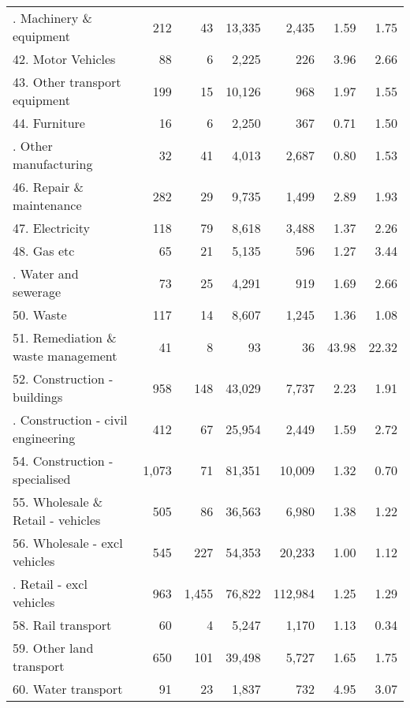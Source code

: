 {\begin{center}
\begin{longtable}{lrrrrrr}
     \hdashline[1pt/1pt]
    41. Machinery \& equipment & 212   & 43    & 13,335 & 2,435 & 1.59  & 1.75 \bigstrut[t]\\
    42. Motor Vehicles & 88    & 6     & 2,225 & 226   & 3.96  & 2.66 \\
    43. Other transport equipment & 199   & 15    & 10,126 & 968   & 1.97  & 1.55 \\
    44. Furniture & 16    & 6     & 2,250 & 367   & 0.71  & 1.50 \bigstrut[b]\\
     \hdashline[1pt/1pt]
    45. Other manufacturing & 32    & 41    & 4,013 & 2,687 & 0.80  & 1.53 \bigstrut[t]\\
    46. Repair \& maintenance & 282   & 29    & 9,735 & 1,499 & 2.89  & 1.93 \\
    47. Electricity & 118   & 79    & 8,618 & 3,488 & 1.37  & 2.26 \\
    48. Gas etc & 65    & 21    & 5,135 & 596   & 1.27  & 3.44 \bigstrut[b]\\
     \hdashline[1pt/1pt]
    49. Water and sewerage & 73    & 25    & 4,291 & 919   & 1.69  & 2.66 \bigstrut[t]\\
    50. Waste & 117   & 14    & 8,607 & 1,245 & 1.36  & 1.08 \\
    51. Remediation \& waste management & 41    & 8     & 93    & 36    & 43.98 & 22.32 \\
    52. Construction - buildings & 958   & 148   & 43,029 & 7,737 & 2.23  & 1.91 \bigstrut[b]\\
     \hdashline[1pt/1pt]
    53. Construction - civil engineering & 412   & 67    & 25,954 & 2,449 & 1.59  & 2.72 \bigstrut[t]\\
    54. Construction - specialised & 1,073 & 71    & 81,351 & 10,009 & 1.32  & 0.70 \\
    55. Wholesale \& Retail - vehicles & 505   & 86    & 36,563 & 6,980 & 1.38  & 1.22 \\
    56. Wholesale - excl vehicles & 545   & 227   & 54,353 & 20,233 & 1.00  & 1.12 \bigstrut[b]\\
     \hdashline[1pt/1pt]
    57. Retail - excl vehicles & 963   & 1,455 & 76,822 & 112,984 & 1.25  & 1.29 \bigstrut[t]\\
    58. Rail transport & 60    & 4     & 5,247 & 1,170 & 1.13  & 0.34 \\
    59. Other land transport & 650   & 101   & 39,498 & 5,727 & 1.65  & 1.75 \\
    60. Water transport & 91    & 23    & 1,837 & 732   & 4.95  & 3.07 \bigstrut[b]\\

\end{longtable}
\end{center}}
